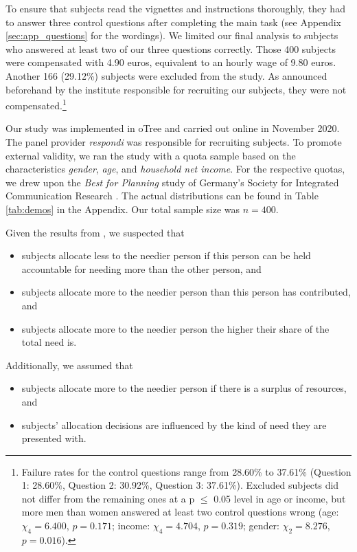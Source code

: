 \documentclass[egregdoesnotlikesansseriftitles]{scrartcl}
\begin{document}
To ensure that subjects read the vignettes and instructions thoroughly, they had to answer three control questions after completing the main task (see Appendix \ref{sec:app_questions} for the wordings).
We limited our final analysis to subjects who answered at least two of our three questions correctly.
Those 400 subjects were compensated with 4.90 euros, equivalent to an hourly wage of 9.80 euros.
Another 166 (29.12\%) subjects were excluded from the study.
As announced beforehand by the institute responsible for recruiting our subjects, they were not compensated.\footnote{Failure rates for the control questions range from 28.60\% to 37.61\% (Question 1: 28.60\%, Question 2: 30.92\%, Question 3: 37.61\%). Excluded subjects did not differ from the remaining ones at a p $\le$ 0.05 level in age or income, but more men than women answered at least two control questions wrong (age: $\chi_4=6.400$, $p=0.171$; income: $\chi_4=4.704$, $p=0.319$; gender: $\chi_2=8.276$, $p=0.016$).}

Our study was implemented in oTree \citep{chen_otree_2016} and carried out online in November 2020.
The panel provider \textit{respondi} was responsible for recruiting subjects.
To promote external validity, we ran the study with a quota sample based on the characteristics \textit{gender}, \textit{age}, and \textit{household net income}.
For the respective quotas, we drew upon the \textit{Best for Planning} study of Germany's Society for Integrated Communication Research \citep[p. 284, 291]{gesellschaft_fur_integrierte_kommunikationsforschung_best_2019}.
The actual distributions can be found in Table \ref{tab:demos} in the Appendix.
Our total sample size was $n=400$.

Given the results from \cite{bauer_need_2022}, we suspected that
\begin{itemize}
	\item[(1)] subjects allocate less to the needier person if this person can be held accountable for needing more than the other person, and
	\item[(2)] subjects allocate more to the needier person than this person has contributed, and
	\item[(3)] subjects allocate more to the needier person the higher their share of the total need is.
\end{itemize}

\noindent Additionally, we assumed that
\begin{itemize}
	\item[(4)] subjects allocate more to the needier person if there is a surplus of resources, and
	\item[(5)] subjects' allocation decisions are influenced by the kind of need they are presented with.
\end{itemize}
\end{document}

